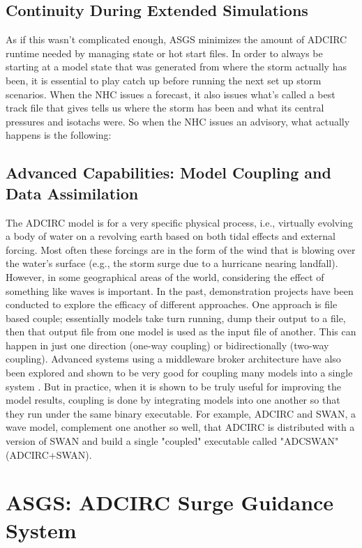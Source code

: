 \documentclass{article}
\begin{document}
\subsection{Continuity During Extended Simulations}

As if this wasn’t complicated enough, ASGS minimizes the amount of ADCIRC
runtime needed by managing state or hot start files. In order to always be
starting at a model state that was generated from where the storm actually has
been, it is essential to play catch up before running the next set up storm
scenarios.  When the NHC issues a forecast, it also issues what’s called a best
track file that gives tells us where the storm has been and what its central
pressures and isotachs were. So when the NHC issues an advisory, what actually
happens is the following:

\subsection{Advanced Capabilities: Model Coupling and Data Assimilation}

The ADCIRC model is for a very specific physical process, i.e., virtually
evolving a body of water on a revolving earth based on both tidal effects and
external forcing. Most often these forcings are in the form of the wind that is
blowing over the water's surface (e.g., the storm surge due to a hurricane
nearing landfall). However, in some geographical areas of the world, considering
the effect of something like waves is important.  In the past, demonstration
projects have been conducted to explore the efficacy of different approaches.
One approach is file based couple; essentially models take turn running, dump
their output to a file, then that output file from one model is used as the
input file of another. This can happen in just one direction (one-way coupling)
or bidirectionally (two-way coupling). Advanced systems using a middleware
broker architecture have also been explored and shown to be very good for
coupling many models into a single system \cite{allard2003high}. But in practice, when
it is shown to be truly useful for improving the model results, coupling is done
by integrating models into one another so that they run under the same binary
executable. For example, ADCIRC and SWAN, a wave model, complement one another
so well, that ADCIRC is distributed with a version of SWAN and build a single
"coupled" executable called "ADCSWAN" (ADCIRC+SWAN).

\section{ASGS: ADCIRC Surge Guidance System}
\end{document}
